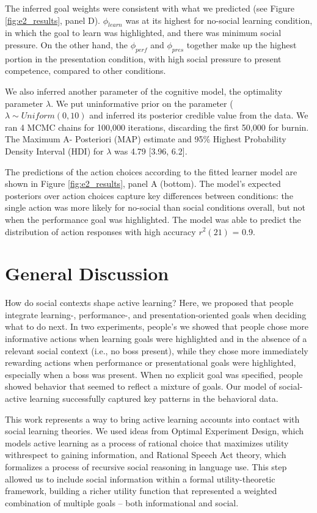 \documentclass[10pt, letterpaper]{article}
\begin{document}
The inferred goal weights were consistent with what we predicted (see
Figure \ref{fig:e2_results}, panel D). \(\phi_{learn}\) was at its
highest for no-social learning condition, in which the goal to learn was
highlighted, and there was minimum social pressure. On the other hand,
the \(\phi_{perf}\) and \(\phi_{pres}\) together make up the highest
portion in the presentation condition, with high social pressure to
present competence, compared to other conditions.

We also inferred another parameter of the cognitive model, the
optimality parameter \(\lambda\). We put uninformative prior on the
parameter (\(\lambda \sim Uniform(0,10)\) and inferred its posterior
credible value from the data. We ran 4 MCMC chains for 100,000
iterations, discarding the first 50,000 for burnin. The Maximum A-
Posteriori (MAP) estimate and 95\% Highest Probability Density Interval
(HDI) for \(\lambda\) was 4.79 {[}3.96, 6.2{]}.

The predictions of the action choices according to the fitted learner
model are shown in Figure \ref{fig:e2_results}, panel A (bottom). The
model's expected posteriors over action choices capture key differences
between conditions: the single action was more likely for no-social than
social conditions overall, but not when the performance goal was
highlighted. The model was able to predict the distribution of action
responses with high accuracy \(r^2(21)\) = 0.9.

\section{General Discussion}\label{general-discussion}

How do social contexts shape active learning? Here, we proposed that
people integrate learning-, performance-, and presentation-oriented
goals when deciding what to do next. In two experiments, people's we
showed that people chose more informative actions when learning goals
were highlighted and in the absence of a relevant social context (i.e.,
no boss present), while they chose more immediately rewarding actions
when performance or presentational goals were highlighted, especially
when a boss was present. When no explicit goal was specified, people
showed behavior that seemed to reflect a mixture of goals. Our model of
social-active learning successfully captured key patterns in the
behavioral data.

This work represents a way to bring active learning accounts into
contact with social learning theories. We used ideas from Optimal
Experiment Design, which models active learning as a process of rational
choice that maximizes utility withrespect to gaining information, and
Rational Speech Act theory, which formalizes a process of recursive
social reasoning in language use. This step allowed us to include social
information within a formal utility-theoretic framework, building a
richer utility function that represented a weighted combination of
multiple goals -- both informational and social.
\end{document}
